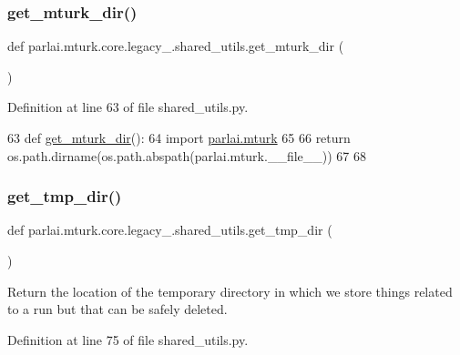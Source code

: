 \subsubsection{\texorpdfstring{get\+\_\+mturk\+\_\+dir()}{get\_mturk\_dir()}}
{\footnotesize\ttfamily def parlai.\+mturk.\+core.\+legacy\+\_.\+shared\+\_\+utils.\+get\+\_\+mturk\+\_\+dir (\begin{DoxyParamCaption}{ }\end{DoxyParamCaption})}



Definition at line 63 of file shared\+\_\+utils.\+py.


\begin{DoxyCode}
63 \textcolor{keyword}{def }\hyperlink{namespaceparlai_1_1mturk_1_1core_1_1shared__utils_aabd480fc6090e1fa769ff3926f7e842d}{get\_mturk\_dir}():
64     \textcolor{keyword}{import} \hyperlink{namespaceparlai_1_1mturk}{parlai.mturk}
65 
66     \textcolor{keywordflow}{return} os.path.dirname(os.path.abspath(parlai.mturk.\_\_file\_\_))
67 
68 
\end{DoxyCode}
\mbox{\label{namespaceparlai_1_1mturk_1_1core_1_1legacy__2018_1_1shared__utils_a78e18954682e28ac24c8ebd529b1e5f8}} 
\subsubsection{\texorpdfstring{get\+\_\+tmp\+\_\+dir()}{get\_tmp\_dir()}}
{\footnotesize\ttfamily def parlai.\+mturk.\+core.\+legacy\+\_.\+shared\+\_\+utils.\+get\+\_\+tmp\+\_\+dir (\begin{DoxyParamCaption}{ }\end{DoxyParamCaption})}

\begin{DoxyVerb}Return the location of the temporary directory in which we store things related to a
run but that can be safely deleted.
\end{DoxyVerb}
 

Definition at line 75 of file shared\+\_\+utils.\+py.


